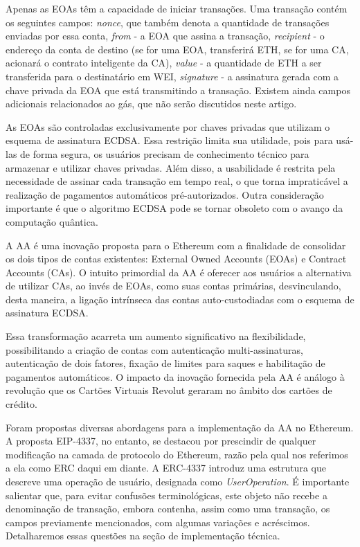 \documentclass[12pt]{article}
\begin{document}
Apenas as EOAs têm a capacidade de iniciar transações. Uma transação contém os seguintes campos:
\textit{nonce}, que também denota a quantidade de transações enviadas por essa conta, \textit{from}
- a EOA que assina a transação, \textit{recipient} - o endereço da conta de destino (se for uma
EOA, transferirá ETH, se for uma CA, acionará o contrato inteligente da CA), \textit{value} - a
quantidade de ETH a ser transferida para o destinatário em WEI, \textit{signature} - a assinatura
gerada com a chave privada da EOA que está transmitindo a transação\cite{15}. Existem ainda campos
adicionais relacionados ao gás\cite{6}, que não serão discutidos neste artigo.

As EOAs são controladas exclusivamente por chaves privadas que utilizam o esquema de assinatura
ECDSA\cite{17}. Essa restrição limita sua utilidade, pois para usá-las de forma segura, os usuários
precisam de conhecimento técnico para armazenar e utilizar chaves privadas. Além disso, a
usabilidade é restrita pela necessidade de assinar cada transação em tempo real, o que torna
impraticável a realização de pagamentos automáticos pré-autorizados. Outra consideração importante
é que o algoritmo ECDSA pode se tornar obsoleto com o avanço da computação quântica\cite{18}.

A AA é uma inovação proposta para o Ethereum com a finalidade de consolidar os dois tipos de contas
existentes: External Owned Accounts (EOAs) e Contract Accounts (CAs). O intuito primordial da AA é
oferecer aos usuários a alternativa de utilizar CAs, ao invés de EOAs, como suas contas primárias,
desvinculando, desta maneira, a ligação intrínseca das contas auto-custodiadas com o esquema de
assinatura ECDSA.

Essa transformação acarreta um aumento significativo na flexibilidade, possibilitando a criação de
contas com autenticação multi-assinaturas, autenticação de dois fatores, fixação de limites para
saques e habilitação de pagamentos automáticos\cite{26,9,12}. O impacto da inovação fornecida pela
AA é análogo à revolução que os Cartões Virtuais Revolut\cite{24} geraram no âmbito dos cartões de
crédito.

Foram propostas diversas abordagens para a implementação da AA no Ethereum\cite{25, 26}. A proposta
EIP-4337, no entanto, se destacou por prescindir de qualquer modificação na camada de protocolo do
Ethereum, razão pela qual nos referimos a ela como ERC daqui em diante. A ERC-4337 introduz uma
estrutura que descreve uma operação de usuário, designada como \textit{UserOperation}\cite{5}. É
importante salientar que, para evitar confusões terminológicas, este objeto não recebe a
denominação de transação, embora contenha, assim como uma transação, os campos previamente
mencionados, com algumas variações e acréscimos. Detalharemos essas questões na seção de
implementação técnica.
\end{document}
